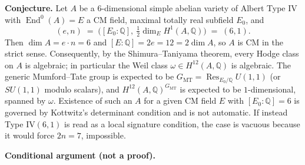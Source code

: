 \documentclass{article}
\begin{document}
\medskip
\noindent\textbf{Conjecture.}
Let \(A\) be a \(6\)-dimensional simple abelian variety of Albert Type IV with
\(\operatorname{End}^0(A) = E\) a CM field, maximal totally real subfield \(E_0\), and
\[
(e,n) \;=\; \bigl([E_0:\mathbb{Q}],\ \tfrac12 \dim_E H^1(A,\mathbb{Q})\bigr) \;=\; (6,1).
\]
Then \(\dim A = e\cdot n = 6\) and \([E:\mathbb{Q}] = 2e = 12 = 2\dim A\), so \(A\) is CM in the strict sense. Consequently, by the Shimura--Taniyama theorem, every Hodge class on \(A\) is algebraic; in particular the Weil class
\(\omega \in H^{12}(A,\mathbb{Q})\) is algebraic. The generic Mumford--Tate group is expected to be
\(G_{\mathrm{MT}} = \operatorname{Res}_{E_0/\mathbb{Q}} U(1,1)\) (or \(SU(1,1)\) modulo scalars), and
\(H^{12}(A,\mathbb{Q})^{G_{\mathrm{MT}}}\) is expected to be \(1\)-dimensional, spanned by \(\omega\). Existence of such an \(A\) for a given CM field \(E\) with \([E_0:\mathbb{Q}] = 6\) is governed by Kottwitz's determinant condition and is not automatic. If instead Type IV\((6,1)\) is read as a local signature condition, the case is vacuous because it would force \(2n = 7\), impossible.

\medskip
\noindent\textbf{Conditional argument (not a proof).}
\end{document}
